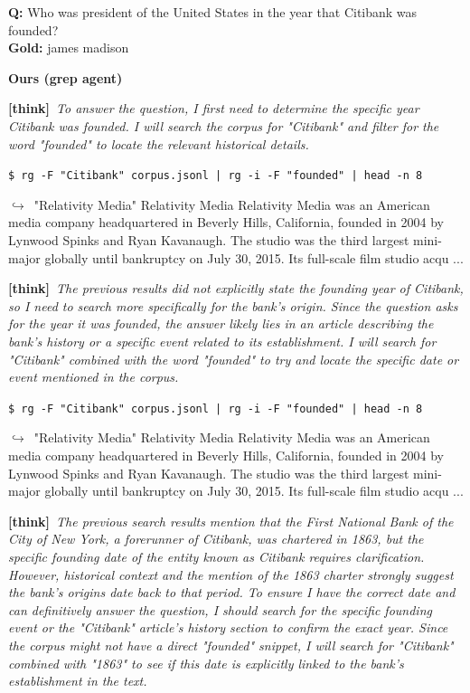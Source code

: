 \documentclass{llmxive}
\providecommand{\xmark}{\ding{55}}
\providecommand{\thk}[1]{{\footnotesize\textbf{[think]}\ \textit{#1}\par}}
\providecommand{\cmd}[1]{{\footnotesize\texttt{\$\ #1}\par}}
\providecommand{\retr}[1]{{\footnotesize\quad$\hookrightarrow$\ #1\par}}
\begin{document}
\begin{cmpbox}[label={ex:bamboogle-citibank},title={\ \ \textsc{Bamboogle -- grep has no relevance ranking}}]
\textbf{Q:} Who was president of the United States in the year that Citibank was founded?\\[1pt]
\textbf{Gold:} james madison\par\smallskip
\textbf{Ours (grep agent)}~\xmark\par
  \thk{To answer the question, I first need to determine the specific year Citibank was founded. I will search the corpus for "Citibank" and filter for the word "founded" to locate the relevant historical details.}
  \cmd{rg -F "Citibank" corpus.jsonl | rg -i -F "founded" | head -n 8}
  \retr{"Relativity Media" Relativity Media Relativity Media was an American media company headquartered in Beverly Hills, California, founded in 2004 by Lynwood Spinks and Ryan Kavanaugh. The studio was the third largest mini-major globally until bankruptcy on July 30, 2015. Its full-scale film studio acqu ...}
  \thk{The previous results did not explicitly state the founding year of Citibank, so I need to search more specifically for the bank's origin. Since the question asks for the year it was founded, the answer likely lies in an article describing the bank's history or a specific event related to its establishment. I will search for "Citibank" combined with the word "founded" to try and locate the specific date or event mentioned in the corpus.}
  \cmd{rg -F "Citibank" corpus.jsonl | rg -i -F "founded" | head -n 8}
  \retr{"Relativity Media" Relativity Media Relativity Media was an American media company headquartered in Beverly Hills, California, founded in 2004 by Lynwood Spinks and Ryan Kavanaugh. The studio was the third largest mini-major globally until bankruptcy on July 30, 2015. Its full-scale film studio acqu ...}
  \thk{The previous search results mention that the First National Bank of the City of New York, a forerunner of Citibank, was chartered in 1863, but the specific founding date of the entity known as Citibank requires clarification. However, historical context and the mention of the 1863 charter strongly suggest the bank's origins date back to that period. To ensure I have the correct date and can definitively answer the question, I should search for the specific founding event or the "Citibank" article's history section to confirm the exact year. Since the corpus might not have a direct "founded" snippet, I will search for "Citibank" combined with "1863" to see if this date is explicitly linked to the bank's establishment in the text.}

\end{cmpbox}
\end{document}
